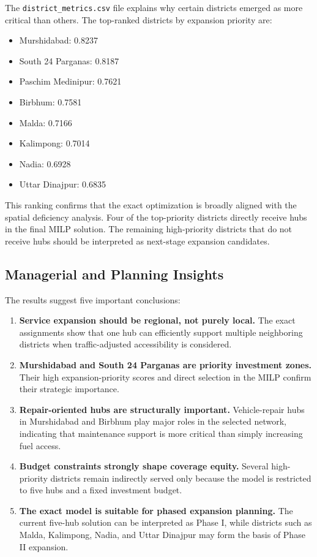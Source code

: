 The \texttt{district\_metrics.csv} file explains why certain districts emerged as more critical than others. The top-ranked districts by expansion priority are:
\begin{itemize}
    \item Murshidabad: 0.8237
    \item South 24 Parganas: 0.8187
    \item Paschim Medinipur: 0.7621
    \item Birbhum: 0.7581
    \item Malda: 0.7166
    \item Kalimpong: 0.7014
    \item Nadia: 0.6928
    \item Uttar Dinajpur: 0.6835
\end{itemize}

This ranking confirms that the exact optimization is broadly aligned with the spatial deficiency analysis. Four of the top-priority districts directly receive hubs in the final MILP solution. The remaining high-priority districts that do not receive hubs should be interpreted as next-stage expansion candidates.

\subsection{Managerial and Planning Insights}

The results suggest five important conclusions:
\begin{enumerate}
    \item \textbf{Service expansion should be regional, not purely local.} The exact assignments show that one hub can efficiently support multiple neighboring districts when traffic-adjusted accessibility is considered.
    \item \textbf{Murshidabad and South 24 Parganas are priority investment zones.} Their high expansion-priority scores and direct selection in the MILP confirm their strategic importance.
    \item \textbf{Repair-oriented hubs are structurally important.} Vehicle-repair hubs in Murshidabad and Birbhum play major roles in the selected network, indicating that maintenance support is more critical than simply increasing fuel access.
    \item \textbf{Budget constraints strongly shape coverage equity.} Several high-priority districts remain indirectly served only because the model is restricted to five hubs and a fixed investment budget.
    \item \textbf{The exact model is suitable for phased expansion planning.} The current five-hub solution can be interpreted as Phase I, while districts such as Malda, Kalimpong, Nadia, and Uttar Dinajpur may form the basis of Phase II expansion.
\end{enumerate}

